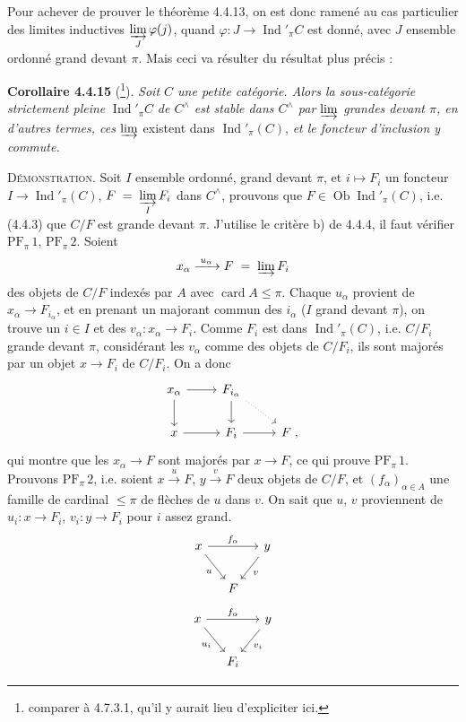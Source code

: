 \documentclass[11pt]{article}
\newcommand{\printedpage}[1]{\marginpar{\footnotesize p.~#1}}
\newcommand{\msp}[1]{\marginpar{\footnotesize [#1]}}
\newcommand{\Ind}{\operatorname{Ind}}
\newcommand{\Ob}{\operatorname{Ob}}
\newcommand{\card}{\operatorname{card}}
\newcommand{\PF}{\mathrm{PF}}
\begin{document}
Pour achever de prouver le théorème 4.4.13, on est donc ramené au cas particulier des limites inductives $\varinjlim\limits_{J}\varphi(j)$, quand $\varphi:J\longrightarrow\Ind'_\pi C$ est donné, avec $J$ ensemble
\printedpage{25}
\msp{page 99}
ordonné grand devant $\pi$. Mais ceci va résulter du résultat plus précis :

\textbf{Corollaire 4.4.15} (\footnote{comparer à 4.7.3.1, qu'il y aurait lieu d'expliciter ici.}). \textit{Soit $C$ une petite catégorie. Alors la sous-catégorie strictement pleine} $\Ind'_\pi C$ \textit{de $C^\wedge$ est stable dans $C^\wedge$ par $\varinjlim$ grandes devant $\pi$, en d'autres termes, ces $\varinjlim$} existent dans $\Ind'_\pi(C)$, \textit{et le foncteur d'inclusion y commute.} %

\textsc{Démonstration}. Soit $I$ ensemble ordonné, grand devant $\pi$, et $i\longmapsto F_i$ un foncteur $I\longrightarrow\Ind'_\pi(C)$, $F\;=\;\varinjlim\limits_{I}F_i$ dans $C^\wedge$, prouvons que $F\in\Ob\Ind'_\pi(C)$, i.e. (4.4.3) que $C/F$ est grande devant $\pi$. J'utilise le critère b) de 4.4.4, il faut vérifier $\PF_\pi\,1$, $\PF_\pi\,2$. Soient
\[
x_\alpha\xrightarrow{\;u_\alpha\;}F\;=\;\varinjlim F_i
\]
des objets de $C/F$ indexés par $A$ avec $\card A\leqslant\pi$. Chaque $u_\alpha$ provient de $x_\alpha\longrightarrow F_{i_\alpha}$, et en prenant un majorant commun des $i_\alpha$ ($I$ grand devant $\pi$), on trouve un $i\in I$ et des $v_\alpha:x_\alpha\longrightarrow F_i$. Comme $F_i$ est dans $\Ind'_\pi(C)$, i.e. $C/F_i$ grande devant $\pi$, considérant les $v_\alpha$ comme des objets de $C/F_i$, ils sont majorés par un objet $x\longrightarrow F_i$ de $C/F_i$. On a donc
\[
\begin{tikzcd}
x_\alpha \arrow[r] \arrow[d] & F_{i_\alpha} \arrow[d] \arrow[dr, dotted] & \\
x \arrow[r] & F_i \arrow[r] & F\;,
\end{tikzcd}
\]
qui montre que les $x_\alpha\longrightarrow F$ sont majorés par $x\longrightarrow F$,
\msp{page 100}
ce qui prouve $\PF_\pi\,1$. Prouvons $\PF_\pi\,2$, i.e. soient $x\xrightarrow{\;u\;}F$, $y\xrightarrow{\;v\;}F$ deux objets de $C/F$, et $(f_\alpha)_{\alpha\in A}$ une famille de cardinal $\leqslant\pi$ de flèches de $u$ dans $v$. On sait que $u$, $v$ proviennent de $u_i:x\longrightarrow F_i$, $v_i:y\longrightarrow F_i$ pour $i$ assez grand.
\[
\begin{tikzcd}[column sep=small]
x \arrow[rr, "f_\alpha"] \arrow[dr, "u"'] & & y \arrow[dl, "v"] \\
& F &
\end{tikzcd}
\]
\[
\begin{tikzcd}[column sep=small]
x \arrow[rr, "f_\alpha"] \arrow[dr, "u_i"'] & & y \arrow[dl, "v_i"] \\
& F_i &
\end{tikzcd}
\]
\end{document}
